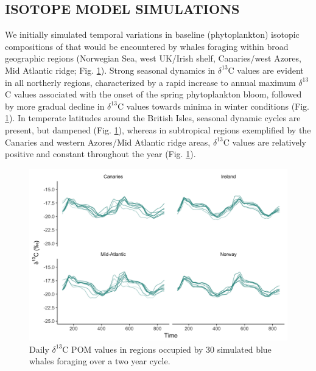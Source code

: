 \documentclass[a4paper,12pt]{article}
\begin{document}
\subsection*{ISOTOPE MODEL SIMULATIONS}
We initially simulated temporal variations in baseline (phytoplankton) isotopic compositions of that would be encountered by whales foraging within broad geographic regions (Norwegian Sea, west UK/Irish shelf, Canaries/west Azores, Mid Atlantic ridge; Fig. \ref{figs4}). 
Strong seasonal dynamics in $\delta^{13}$C values are evident in all northerly regions, characterized by a rapid increase to annual maximum $\delta^{13}$C values associated with the onset of the spring phytoplankton bloom, followed by more gradual decline in $\delta^{13}$C values towards minima in winter conditions (Fig. \ref{figs4}). 
In temperate latitudes around the British Isles, seasonal dynamic cycles are present, but dampened (Fig. \ref{figs4}), whereas in subtropical regions exemplified by the Canaries and western Azores/Mid Atlantic ridge areas, $\delta^{13}$C values are relatively positive and constant throughout the year (Fig. \ref{figs4}).
 
  \begin{figure}[!htbp]
    \centering
      \includegraphics[width=\linewidth]{figures/Figure-S4-facet-wrap-d13C.png}
      \caption{Daily $\delta^{13}$C POM values in regions occupied by 30 simulated blue whales foraging over a two year cycle.} %
      \label{figs4}
  \end{figure}
 
\end{document}
